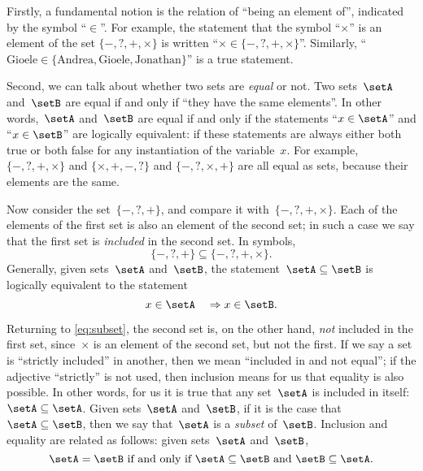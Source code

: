 {%

Firstly, a fundamental notion is the relation of ``being an element of'', indicated by the symbol ``$\in$''.
For example, the statement that the symbol ``$\times$'' is an element of the set $\{ -, ?, +, \times \}$ is written ``$\times \in \{ -, ?, +, \times \}$''.
Similarly, ``$\text{Gioele} \in \{ \text{Andrea}, \text{Gioele}, \text{Jonathan} \}$'' is a true statement.

Second, we can talk about whether two sets are \emph{equal} or not.
Two sets~$\setA$ and~$\setB$ are equal if and only if ``they have the same elements''.
In other words,~$\setA$ and~$\setB$ are equal if and only if the statements
``$x \in \setA$'' and  ``$x \in \setB$'' are logically equivalent: if these statements are always either both true or both false for any instantiation of the variable~$x$.
For example, $\{ -, ?, +, \times \}$ and $\{ \times, +, -, ?\}$ and $\{ -, ?, \times, + \}$ are all equal as sets, because their elements are the same.

Now consider the set~$\{ -, ?, + \}$, and compare it with~$\{ -, ?, +, \times \}$.
Each of the elements of the first set is also an element of the second set; in such a case we say that the first set is \emph{included} in the second set. In symbols,
\begin{equation}
  \label{eq:subset}
\{ -, ?, + \} \subseteq \{ -, ?, +, \times \}.
\end{equation}
Generally, given sets~$\setA$ and~$\setB$, the statement~$\setA \subseteq \setB$ is logically equivalent to the statement
\begin{equation}
x \in \setA \quad \Rightarrow  x \in \setB.
\end{equation}

Returning to \cref{eq:subset}, the second set is, on the other hand, \emph{not} included in the first set, since~$\times$ is an element of the second set, but not the first.
If we say a set is ``strictly included'' in another, then we mean ``included in and not equal'';
if the adjective ``strictly'' is not used, then inclusion means for us that equality is also possible.
In other words, for us it is true that any set~$\setA$ is included in itself:~$\setA \subseteq \setA$.
Given sets~$\setA$ and~$\setB$, if it is the case that~$\setA \subseteq \setB$, then we say that~$\setA$ is a \emph{subset} of~$\setB$.
Inclusion and equality are related as follows: given sets~$\setA$ and~$\setB$,
\begin{equation}
\setA = \setB \text{ if and only if } \setA \subseteq \setB \text{ and } \setB \subseteq \setA.
\end{equation}

}
